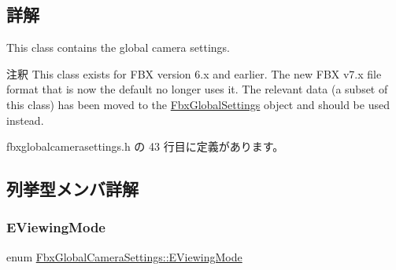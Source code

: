 \subsection{詳解}
This class contains the global camera settings.

\begin{DoxyRemark}{注釈}
This class exists for F\+BX version 6.\+x and earlier. The new F\+BX v7.\+x file format that is now the default no longer uses it. The relevant data (a subset of this class) has been moved to the \hyperlink{class_fbx_global_settings}{Fbx\+Global\+Settings} object and should be used instead. 
\end{DoxyRemark}


 fbxglobalcamerasettings.\+h の 43 行目に定義があります。



\subsection{列挙型メンバ詳解}
\mbox{\label{class_fbx_global_camera_settings_aaa674f8b39e4cd57d7cc07f381f11858}} 
\subsubsection{\texorpdfstring{E\+Viewing\+Mode}{EViewingMode}}
{\footnotesize\ttfamily enum \hyperlink{class_fbx_global_camera_settings_aaa674f8b39e4cd57d7cc07f381f11858}{Fbx\+Global\+Camera\+Settings\+::\+E\+Viewing\+Mode}}

